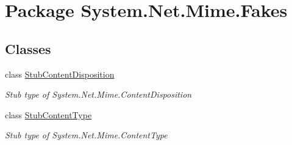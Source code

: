 \hypertarget{namespace_system_1_1_net_1_1_mime_1_1_fakes}{\section{Package System.\-Net.\-Mime.\-Fakes}
\label{namespace_system_1_1_net_1_1_mime_1_1_fakes}
}
\subsection*{Classes}
\begin{DoxyCompactItemize}
\item 
class \hyperlink{class_system_1_1_net_1_1_mime_1_1_fakes_1_1_stub_content_disposition}{Stub\-Content\-Disposition}
\begin{DoxyCompactList}\small\item\em Stub type of System.\-Net.\-Mime.\-Content\-Disposition\end{DoxyCompactList}\item 
class \hyperlink{class_system_1_1_net_1_1_mime_1_1_fakes_1_1_stub_content_type}{Stub\-Content\-Type}
\begin{DoxyCompactList}\small\item\em Stub type of System.\-Net.\-Mime.\-Content\-Type\end{DoxyCompactList}\end{DoxyCompactItemize}
